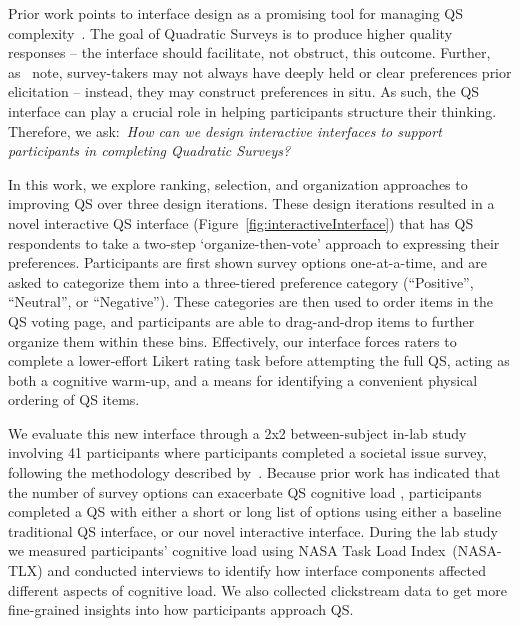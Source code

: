 
Prior work points to interface design as a promising tool for managing QS complexity~\cite{engstrom2020politics, weijtersEffectRatingScale2010, kierujVariationsResponseStyle2010, toepoelSmileysStarsHearts2019, farzandAestheticsEvaluatingResponse2024, xiaoTellMeYourself2020, pielotDidYouMisclick2024}. The goal of Quadratic Surveys is to produce higher quality responses --  the interface should facilitate, not obstruct, this outcome. Further, as~\textcite{lichtensteinConstructionPreference2006} note, survey-takers may not always have deeply held or clear preferences prior elicitation -- instead, they may construct preferences in situ. As such, the QS interface can play a crucial role in helping participants structure their thinking. Therefore, we ask:~\textit{How can we design interactive interfaces to support participants in completing Quadratic Surveys?}

In this work, we explore ranking, selection, and organization approaches to improving QS over three design iterations. These design iterations resulted in a novel interactive QS interface (Figure~\ref{fig:interactiveInterface}) that has QS respondents to take a two-step `organize-then-vote' approach to expressing their preferences. Participants are first shown survey options one-at-a-time, and are asked to categorize them into a three-tiered preference category (``Positive'', ``Neutral'', or ``Negative''). These categories are then used to order items in the QS voting page, and participants are able to drag-and-drop items to further organize them within these bins. Effectively, our interface forces raters to complete a lower-effort Likert rating task before attempting the full QS, acting as both a cognitive warm-up, and a means for identifying a convenient physical ordering of QS items.

We evaluate this new interface through a 2x2 between-subject in-lab study involving 41 participants where participants completed a societal issue survey, following the methodology described by~\textcite{chengCanShowWhat2021}. Because prior work has indicated that the number of survey options can exacerbate QS cognitive load \cite{lenznerCognitiveBurdenSurvey2010, blessAskingDifficultQuestions1992}, participants completed a QS with either a short or long list of options using either a baseline traditional QS interface, or our novel interactive interface. During the lab study we measured participants' cognitive load using NASA Task Load Index~(NASA-TLX) and conducted interviews to identify how interface components affected different aspects of cognitive load. We also collected clickstream data to get more fine-grained insights into how participants approach QS. 

